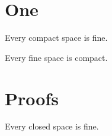 \documentclass{appjour}
\begin{document}
\section{One}
\begin{Lemma} Every compact space is fine. \end{Lemma}
\begin{Lemma} Every fine space is compact. \end{Lemma}
\appendix
\section{Proofs}
\begin{Lemma} Every closed space is fine. \end{Lemma}
\end{document}
